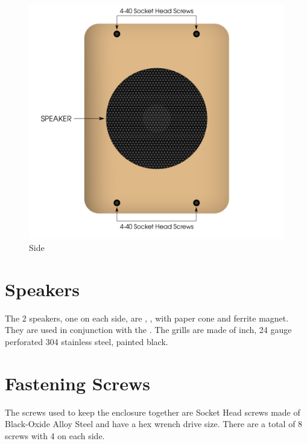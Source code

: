 \begin{figure}[H]
\centering
  \includegraphics{images/side.png}
\caption{Side}
\end{figure}

\section{Speakers} \label{Speakers}

The \num{2} speakers, one on each side, are \mono{8\thinspace\small{$\Omega$}},
,  with paper cone and ferrite magnet.
They are used in conjunction with the \hyperref[Audio]{}.  The grills are
made of  inch, \num{24} gauge perforated \num{304} stainless steel,
painted black.

\section{Fastening Screws} \label{Fastening Screws}

The screws used to keep the enclosure together are  Socket Head
screws made of Black-Oxide Alloy Steel and have a  hex wrench drive
size.  There are a total of \num{8} screws with \num{4} on each side.

